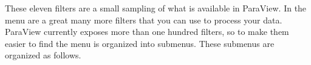 


These eleven filters are a small sampling of what is available in ParaView.
In the  menu are a great many more filters that you can use to
process your data.  ParaView currently exposes more than one hundred filters, so to
make them easier to find the  menu is organized into submenus.
These submenus are organized as follows.

